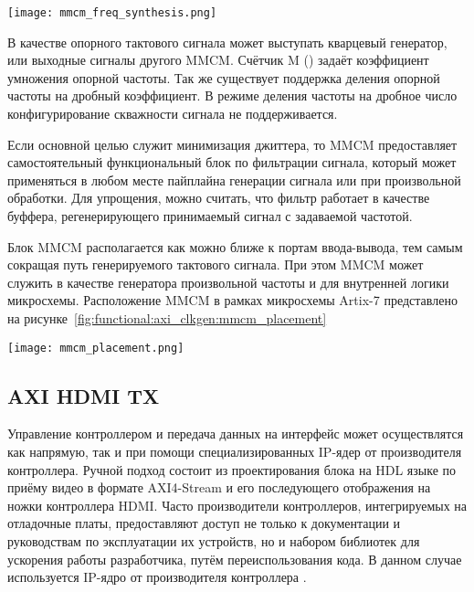 \begin{center}
  \centering
  \texttt{[image: mmcm\_freq\_synthesis.png]}
  \label{fig:functional:axi_clkgen:mmcm_freq_synthesis}
\end{center}

В качестве опорного тактового сигнала может выступать кварцевый генератор, или выходные
сигналы другого MMCM. Счётчик M () задаёт коэффициент умножения опорной частоты.
Так же существует поддержка деления опорной частоты на дробный коэффициент. В режиме
деления частоты на дробное число конфигурирование скважности сигнала не поддерживается.

Если основной целью служит минимизация джиттера, то MMCM предоставляет самостоятельный
функциональный блок по фильтрации сигнала, который может применяться в любом месте
пайплайна генерации сигнала или при произвольной обработки. Для упрощения, можно считать, что
фильтр работает в качестве буффера, регенерирующего принимаемый сигнал с задаваемой частотой.

Блок  MMCM располагается как можно ближе к портам ввода-вывода, тем самым сокращая путь генерируемого тактового сигнала.
При этом MMCM может служить в качестве генератора произвольной частоты и для внутренней логики микросхемы.
Расположение MMCM в рамках микросхемы Artix-7 представлено на рисунке~\ref{fig:functional:axi_clkgen:mmcm_placement}

\begin{center}
  \centering
  \texttt{[image: mmcm\_placement.png]}
  \label{fig:functional:axi_clkgen:mmcm_placement}
\end{center}

\subsection{AXI HDMI TX}
\label{sec:functional:axi_hdmi_tx}

Управление контроллером  и передача данных на интерфейс может осуществлятся как напрямую,
так и при помощи специализированных IP-ядер от производителя контроллера. Ручной подход состоит из
проектирования блока на HDL языке по приёму видео в формате AXI4-Stream и его последующего отображения
на ножки контроллера HDMI. Часто производители контроллеров, интегрируемых на отладочные платы, предоставляют
доступ не только к документации и руководствам по эксплуатации их устройств, но и набором библиотек для
ускорения работы разработчика, путём переиспользования кода. В данном случае используется IP-ядро
от производителя контроллера .

